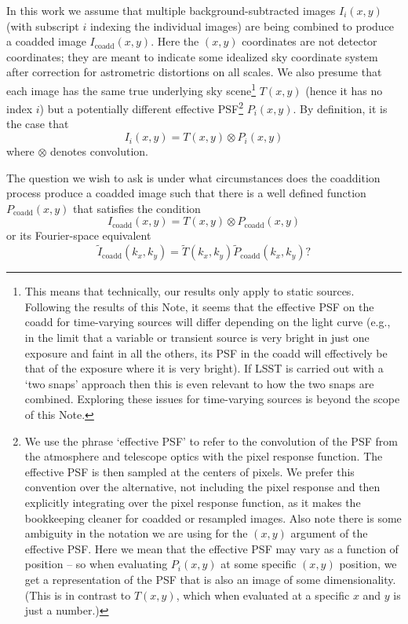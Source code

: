 \documentclass[modern]{style_and_logos/lsstdescnote}
\begin{document}
In this work we assume that multiple background-subtracted images $I_i(x,y)$ (with subscript $i$ indexing the individual images) are being combined to produce a coadded image $I_\text{coadd}(x,y)$.  Here the $(x,y)$ coordinates are not detector coordinates; they are meant to indicate some idealized sky coordinate system after correction for astrometric distortions on all scales. We also presume that each image has the same true underlying sky scene\footnote{This means that technically, our results only apply to static sources.  Following the results of this Note, it seems that the effective PSF on the coadd for time-varying sources will differ depending on the light curve (e.g., in the limit that a variable or transient source is very bright in just one exposure and faint in all the others, its PSF in the coadd will effectively be that of the exposure where it is very bright). If LSST is carried out with a `two snaps' approach then this is even relevant to how the two snaps are combined. Exploring these issues for time-varying sources is beyond the scope of this Note.} $T(x,y)$ (hence it has no index $i$) but a potentially different effective PSF\footnote{We use the phrase `effective PSF' to refer to the convolution of the PSF from the atmosphere and telescope optics with the pixel response function.  The effective PSF is then sampled at the centers of pixels.  We prefer this convention over the alternative, not including the pixel response and then explicitly integrating over the pixel response function, as it makes the bookkeeping cleaner for coadded or resampled images. Also note there is some ambiguity in the notation we are using for the $(x,y)$ argument of the effective PSF.  Here we mean that the effective PSF may vary as a function of position -- so when evaluating $P_i(x,y)$ at some specific $(x,y)$ position, we get a representation of the PSF that is also an image of some dimensionality.  (This is in contrast to $T(x,y)$, which when evaluated at a specific $x$ and $y$ is just a number.)} $P_i(x,y)$.  By definition, it is the case that
\begin{equation}
I_i(x,y) = T(x,y) \otimes P_i(x,y)    
\end{equation}
where $\otimes$ denotes convolution.

The question we wish to ask is under what circumstances does the coaddition process produce a coadded image such that there is a well defined function $P_\text{coadd}(x,y)$ that satisfies the condition
\begin{equation}\label{eq:coaddpsf}
    I_\text{coadd}(x,y) = T(x,y) \otimes P_\text{coadd}(x,y)
\end{equation}
or its Fourier-space equivalent 
\begin{equation}\label{eq:kcoaddpsf}
    \widetilde{I}_\text{coadd}(k_x,k_y) = \widetilde{T}(k_x,k_y) \widetilde{P}_\text{coadd}(k_x,k_y)?
\end{equation}
\end{document}
